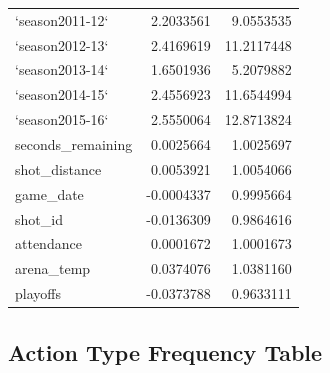 \documentclass[american,]{article}
\begin{document}
\begin{longtable}{lrr}
`season2011-12` & 2.2033561 & 9.0553535\\
\addlinespace
\rowcolor{gray!6}  `season2012-13` & 2.4169619 & 11.2117448\\
`season2013-14` & 1.6501936 & 5.2079882\\
\rowcolor{gray!6}  `season2014-15` & 2.4556923 & 11.6544994\\
`season2015-16` & 2.5550064 & 12.8713824\\
\rowcolor{gray!6}  seconds\_remaining & 0.0025664 & 1.0025697\\
\addlinespace
shot\_distance & 0.0053921 & 1.0054066\\
\rowcolor{gray!6}  game\_date & -0.0004337 & 0.9995664\\
shot\_id & -0.0136309 & 0.9864616\\
\rowcolor{gray!6}  attendance & 0.0001672 & 1.0001673\\
arena\_temp & 0.0374076 & 1.0381160\\
\addlinespace
\rowcolor{gray!6}  playoffs & -0.0373788 & 0.9633111\\*
\end{longtable}
\endgroup{}

\hypertarget{action-type-frequency-table}{%
\subsection{\texorpdfstring{\textbf{Action Type Frequency Table}}{Action Type Frequency Table}}\label{action-type-frequency-table}}

\begingroup\fontsize{10}{12}\selectfont
\end{document}
